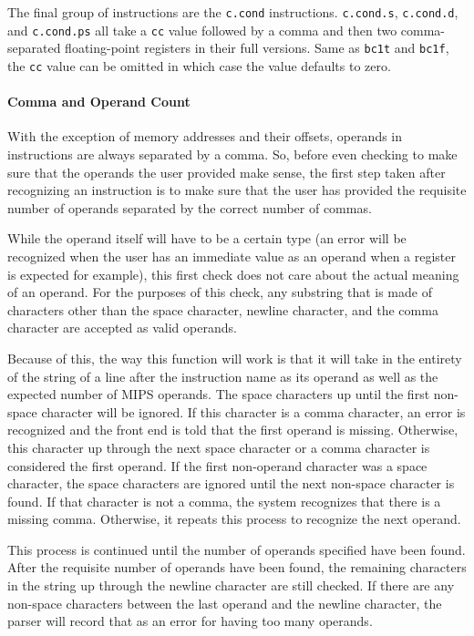 \documentclass[
    paper=letter,
    parskip=half,
    fontsize=12pt,
    titlepage=firstiscover,
    toc=bibliography,
    numbers=endperiod
]{scrartcl}
\begin{document}
The final group of instructions are the \texttt{c.cond} instructions.
\texttt{c.cond.s}, \texttt{c.cond.d}, and \texttt{c.cond.ps} all take a
\texttt{cc} value followed by a comma and then two comma-separated
floating-point registers in their full versions. Same as \texttt{bc1t}
and \texttt{bc1f}, the \texttt{cc} value can be omitted in which case
the value defaults to zero.

\paragraph{Comma and Operand Count}
\label{subsec:comma-and-operand-count}

With the exception of memory addresses and their offsets, operands in
instructions are always separated by a comma. So, before even checking
to make sure that the operands the user provided make sense, the first
step taken after recognizing an instruction is to make sure that the
user has provided the requisite number of operands separated by the
correct number of commas.

While the operand itself will have to be a certain type (an error will
be recognized when the user has an immediate value as an operand when a
register is expected for example), this first check does not care about
the actual meaning of an operand. For the purposes of this check, any
substring that is made of characters other than the space character,
newline character, and the comma character are accepted as valid
operands.

Because of this, the way this function will work is that it will take in
the entirety of the string of a line after the instruction name as its
operand as well as the expected number of MIPS operands. The space
characters up until the first non-space character will be ignored. If
this character is a comma character, an error is recognized and the
front end is told that the first operand is missing. Otherwise, this
character up through the next space character or a comma character is
considered the first operand. If the first non-operand character was a
space character, the space characters are ignored until the next
non-space character is found. If that character is not a comma, the
system recognizes that there is a missing comma. Otherwise, it repeats
this process to recognize the next operand.

This process is continued until the number of operands specified have
been found. After the requisite number of operands have been found, the
remaining characters in the string up through the newline character are
still checked. If there are any non-space characters between the last
operand and the newline character, the parser will record that as an
error for having too many operands.
\end{document}
